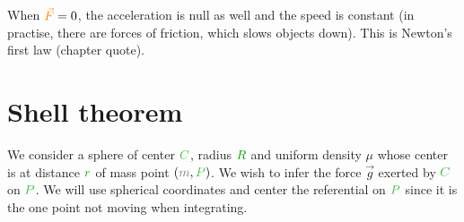 \begin{remark}
When $\textcolor{orange}{\vec F} = 0$, the acceleration is null as well and the
speed is constant (in practise, there are forces of friction, which
slows objects down). This is Newton's first law (chapter quote).
\end{remark}



\section{Shell theorem}

We consider a sphere of center $\posit{C}$, radius $\dist{R}$ and uniform
density $\mu$ whose center is at distance $\dist{r}$ of mass point
$(\mass{m},\posit{P})$. We wish to infer the force $\vec g$ exerted
by $\posit{C}$ on $\posit{P}$. We will use spherical coordinates and
center the referential on $\posit{P}$ since it is the one point not
moving when integrating.

\begin{figure}[H]
\centering
{}
\end{figure}

